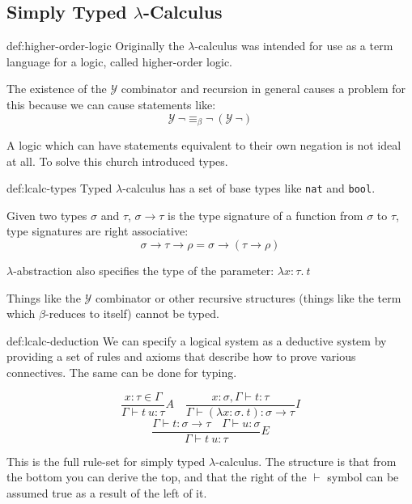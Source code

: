 \documentclass[landscape, 8pt]{extarticle}
\begin{document}
\begin{multicols}{3}
\subsection*{Simply Typed $\lambda$-Calculus}
\begin{dfn}{def:higher-order-logic}{}
Originally the $\lambda$-calculus was intended for use as a term language for a logic, called higher-order logic.

The existence of the $\mathcal{Y}$ combinator and recursion in general causes a problem for this because we can cause statements like:
\[\mathcal{Y} \: \neg \equiv_\beta \neg \: (\mathcal{Y} \: \neg)\]

A logic which can have statements equivalent to their own negation is not ideal at all. To solve this church introduced types.
\end{dfn}


\begin{dfn}[Types]{def:lcalc-types}{}
Typed $\lambda$-calculus has a set of base types like \texttt{nat} and \texttt{bool}.

Given two types $\sigma$ and $\tau$, $\sigma \to \tau$ is the type signature of a function from $\sigma$ to $\tau$, type signatures are right associative:
\[\sigma \to \tau \to \rho = \sigma \to (\tau \to \rho)\]

$\lambda$-abstraction also specifies the type of the parameter: $\lambda x : \tau.\:t$

Things like the $\mathcal{Y}$ combinator or other recursive structures (things like the term which $\beta$-reduces to itself) cannot be typed.
\end{dfn}

\begin{dfn}{def:lcalc-deduction}{}
We can specify a logical system as a deductive system by providing a set of rules and axioms that describe how to prove various connectives. The same can be done for typing.

\[\frac{x : \tau \in \Gamma}{\Gamma \vdash t \: u : \tau}A \quad \frac{x : \sigma, \Gamma \vdash t : \tau}{\Gamma \vdash (\lambda x : \sigma.\:t) : \sigma \to \tau}I\]
\[\frac{\Gamma \vdash t : \sigma \to \tau \quad \Gamma \vdash u : \sigma}{\Gamma \vdash t \: u : \tau}E\]

This is the full rule-set for simply typed $\lambda$-calculus. The structure is that from the bottom you can derive the top, and that the right of the $\vdash$ symbol can be assumed true as a result of the left of it.


\end{dfn}
\end{multicols}
\end{document}
